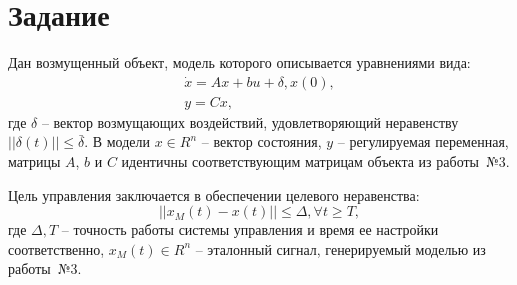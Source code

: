 \documentclass[14pt, a4paper]{extarticle}
\begin{document}
	\onehalfspacing
	
	\setcounter{page}{2}
	
	\section*{Задание}
	
	Дан возмущенный объект, модель которого описывается уравнениями вида:
	$$\begin{matrix}
		\dot{x} = Ax + bu + \delta, x(0),\\
		y = Cx,
	\end{matrix}$$
	где $\delta$ -- вектор возмущающих воздействий, удовлетворяющий неравенству $\left|\left|\delta(t)\right|\right|\le \bar{\delta}$. В модели $x\in R^n$ -- вектор состояния, $y$ -- регулируемая переменная, матрицы $A$, $b$ и $C$ идентичны соответствующим матрицам объекта из работы~№3.
	
	Цель управления заключается в обеспечении целевого неравенства:
	$$\left|\left|x_M(t)-x(t)\right|\right|\le\Delta, \forall t \ge T,$$
	где $\Delta, T$ -- точность работы системы управления и время ее настройки соответственно, $x_M(t)\in R^n$ -- эталонный сигнал, генерируемый моделью из работы~№3.
\end{document}
